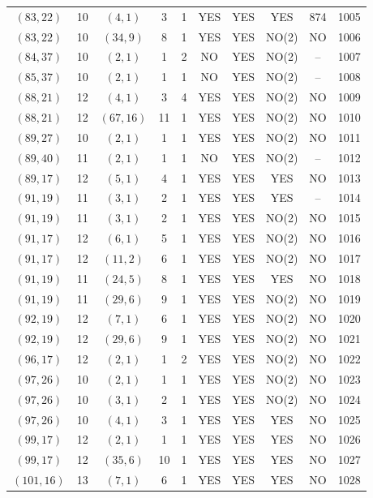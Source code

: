 \begin{longtable}{|c|c|c|c|c|c|c|c|c|c|}
$(83, 22)$ & 10 & $(4, 1)$ & 3 & 1 & YES & YES & YES & 874 & 1005\\
$(83, 22)$ & 10 & $(34, 9)$ & 8 & 1 & YES & YES & NO(2) & NO & 1006\\
$(84, 37)$ & 10 & $(2, 1)$ & 1 & 2 & NO & YES & NO(2) & -- & 1007\\
$(85, 37)$ & 10 & $(2, 1)$ & 1 & 1 & NO & YES & NO(2) & -- & 1008\\
$(88, 21)$ & 12 & $(4, 1)$ & 3 & 4 & YES & YES & NO(2) & NO & 1009\\
$(88, 21)$ & 12 & $(67, 16)$ & 11 & 1 & YES & YES & NO(2) & NO & 1010\\
$(89, 27)$ & 10 & $(2, 1)$ & 1 & 1 & YES & YES & NO(2) & NO & 1011\\
$(89, 40)$ & 11 & $(2, 1)$ & 1 & 1 & NO & YES & NO(2) & -- & 1012\\
$(89, 17)$ & 12 & $(5, 1)$ & 4 & 1 & YES & YES & YES & NO & 1013\\
$(91, 19)$ & 11 & $(3, 1)$ & 2 & 1 & YES & YES & YES & -- & 1014\\
$(91, 19)$ & 11 & $(3, 1)$ & 2 & 1 & YES & YES & NO(2) & NO & 1015\\
$(91, 17)$ & 12 & $(6, 1)$ & 5 & 1 & YES & YES & NO(2) & NO & 1016\\
$(91, 17)$ & 12 & $(11, 2)$ & 6 & 1 & YES & YES & NO(2) & NO & 1017\\
$(91, 19)$ & 11 & $(24, 5)$ & 8 & 1 & YES & YES & YES & NO & 1018\\
$(91, 19)$ & 11 & $(29, 6)$ & 9 & 1 & YES & YES & NO(2) & NO & 1019\\
$(92, 19)$ & 12 & $(7, 1)$ & 6 & 1 & YES & YES & NO(2) & NO & 1020\\
$(92, 19)$ & 12 & $(29, 6)$ & 9 & 1 & YES & YES & NO(2) & NO & 1021\\
$(96, 17)$ & 12 & $(2, 1)$ & 1 & 2 & YES & YES & NO(2) & NO & 1022\\
$(97, 26)$ & 10 & $(2, 1)$ & 1 & 1 & YES & YES & NO(2) & NO & 1023\\
$(97, 26)$ & 10 & $(3, 1)$ & 2 & 1 & YES & YES & NO(2) & NO & 1024\\
$(97, 26)$ & 10 & $(4, 1)$ & 3 & 1 & YES & YES & YES & NO & 1025\\
$(99, 17)$ & 12 & $(2, 1)$ & 1 & 1 & YES & YES & YES & NO & 1026\\
$(99, 17)$ & 12 & $(35, 6)$ & 10 & 1 & YES & YES & YES & NO & 1027\\
$(101, 16)$ & 13 & $(7, 1)$ & 6 & 1 & YES & YES & YES & NO & 1028\\

\end{longtable}
